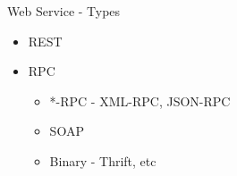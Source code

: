 \begin{frame}{Web Service - Types}
    \begin{itemize}
      \item REST
      \item RPC
      \begin{itemize}
        \item *-RPC - XML-RPC, JSON-RPC
        \item SOAP
        \item Binary - Thrift, etc
      \end{itemize}
    \end{itemize}
\end{frame}
